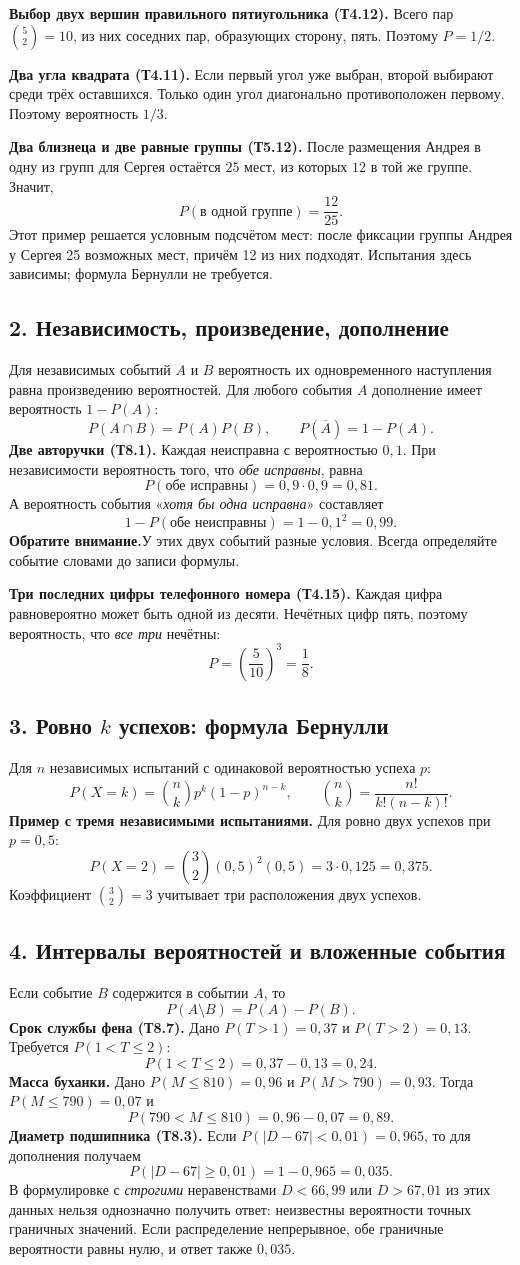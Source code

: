 \documentclass[a4paper,12pt]{article}
\newcommand{\subtopic}[1]{\subsection*{\textcolor{darkaccent}{#1}}\vspace{-1mm}}
\newcommand{\warning}[1]{\textcolor{warn}{\textbf{Обратите внимание.}}\enspace #1}
\begin{document}
\textbf{Выбор двух вершин правильного пятиугольника (Т4.12).} Всего пар $\binom52=10$, из них соседних пар, образующих сторону, пять. Поэтому $P=1/2$.

\textbf{Два угла квадрата (Т4.11).} Если первый угол уже выбран, второй выбирают среди трёх оставшихся. Только один угол диагонально противоположен первому. Поэтому вероятность $1/3$.

\textbf{Два близнеца и две равные группы (Т5.12).} После размещения Андрея в одну из групп для Сергея остаётся $25$ мест, из которых $12$ в той же группе. Значит,
\[
P(\text{в одной группе})=\boxed{\frac{12}{25}}.
\]
Этот пример решается условным подсчётом мест: после фиксации группы Андрея у Сергея 25 возможных мест, причём 12 из них подходят. Испытания здесь зависимы; формула Бернулли не требуется.

\subtopic{2. Независимость, произведение, дополнение}
Для независимых событий $A$ и $B$ вероятность их одновременного наступления равна произведению вероятностей. Для любого события $A$ дополнение имеет вероятность $1-P(A)$:
\[
P(A\cap B)=P(A)P(B),\qquad P(\overline A)=1-P(A).
\]
\textbf{Две авторучки (Т8.1).} Каждая неисправна с вероятностью $0{,}1$. При независимости вероятность того, что \emph{обе исправны}, равна
\[
P(\text{обе исправны})=0{,}9\cdot0{,}9=\boxed{0{,}81}.
\]
А вероятность события «\emph{хотя бы одна исправна}» составляет
\[
1-P(\text{обе неисправны})=1-0{,}1^2=0{,}99.
\]
\warning{У этих двух событий разные условия. Всегда определяйте событие словами до записи формулы.}

\textbf{Три последних цифры телефонного номера (Т4.15).} Каждая цифра равновероятно может быть одной из десяти. Нечётных цифр пять, поэтому вероятность, что \emph{все три} нечётны:
\[
P=\left(\frac5{10}\right)^3=\frac18.
\]

\subtopic{3. Ровно $k$ успехов: формула Бернулли}
Для $n$ независимых испытаний с одинаковой вероятностью успеха $p$:
\[
\boxed{P(X=k)=\binom nk p^k(1-p)^{n-k}},\qquad
\binom nk=\frac{n!}{k!(n-k)!}.
\]
\textbf{Пример с тремя независимыми испытаниями.} Для ровно двух успехов при $p=0{,}5$:
\[
P(X=2)=\binom32(0{,}5)^2(0{,}5)=3\cdot0{,}125=0{,}375.
\]
Коэффициент $\binom32=3$ учитывает три расположения двух успехов.

\subtopic{4. Интервалы вероятностей и вложенные события}
Если событие $B$ содержится в событии $A$, то
\[
\boxed{P(A\setminus B)=P(A)-P(B)}.
\]
\textbf{Срок службы фена (Т8.7).} Дано $P(T>1)=0{,}37$ и $P(T>2)=0{,}13$. Требуется $P(1<T\le2)$:
\[
\boxed{P(1<T\le2)=0{,}37-0{,}13=0{,}24}.
\]
\textbf{Масса буханки.} Дано $P(M\le810)=0{,}96$ и $P(M>790)=0{,}93$. Тогда $P(M\le790)=0{,}07$ и
\[
\boxed{P(790<M\le810)=0{,}96-0{,}07=0{,}89}.
\]
\textbf{Диаметр подшипника (Т8.3).} Если $P(|D-67|<0{,}01)=0{,}965$, то для дополнения получаем
\[
\boxed{P(|D-67|\ge0{,}01)=1-0{,}965=0{,}035}.
\]
В формулировке с \emph{строгими} неравенствами $D<66{,}99$ или $D>67{,}01$ из этих данных нельзя однозначно получить ответ: неизвестны вероятности точных граничных значений. Если распределение непрерывное, обе граничные вероятности равны нулю, и ответ также $0{,}035$.
\end{document}
